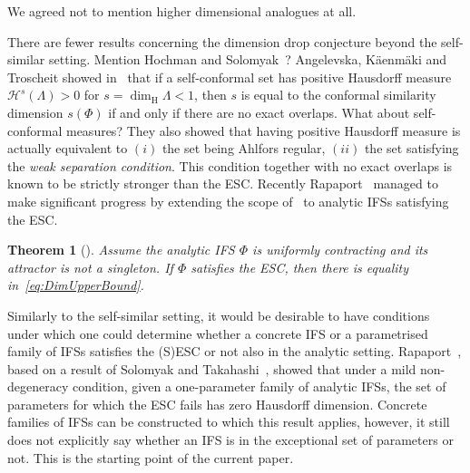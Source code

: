 \documentclass[12pt,]{article}
\newtheorem{theorem}{Theorem}[section]
\theoremstyle{definition}
\theoremstyle{remark}
\newcommand{\0}{\mathbf{0}}
\begin{document}
{{\color{red} We agreed not to mention higher dimensional analogues at all.
}


There are fewer results concerning the dimension drop conjecture beyond the self-similar setting. {\color{red} Mention Hochman and Solomyak~\cite{HochmanSolomyak_Invent17}?} Angelevska, K\"{a}enm\"{a}ki and Troscheit showed in~\cite{TroscheitKaenmakiAngelewska_SelfConf} that if a self-conformal set has positive Hausdorff measure $\mathcal{H}^s(\Lambda)>0$ for $s=\dim_{\mathrm{H}}\Lambda<1$, then $s$ is equal to the conformal similarity dimension $s(\Phi)$ if and only if there are no exact overlaps. {\color{red} What about self-conformal measures?} They also showed that having positive Hausdorff measure is actually equivalent to $(i)$ the set being Ahlfors regular, $(ii)$ the set satisfying the \emph{weak separation condition}. This condition together with no exact overlaps is known to be strictly stronger than the ESC. Recently Rapaport~\cite{Rapaport_SelfConfESC25arXiv} managed to make significant progress by extending the scope of~\cite{TroscheitKaenmakiAngelewska_SelfConf, Hochman_SelfSimESC_Annals} to analytic IFSs satisfying the ESC.

\begin{theorem}[\cite{Rapaport_SelfConfESC25arXiv}]\label{thm:RapaportMain}
Assume the analytic IFS $\Phi$ is uniformly contracting and its attractor is not a singleton. If $\Phi$ satisfies the ESC, then there is equality in~\cref{eq:DimUpperBound}.
\end{theorem}

Similarly to the self-similar setting, it would be desirable to have conditions under which one could determine whether a concrete IFS or a parametrised family of IFSs satisfies the (S)ESC or not also in the analytic setting. Rapaport~\cite[Corollary 1.4]{Rapaport_SelfConfESC25arXiv}, based on a result of Solomyak and Takahashi~\cite{SolomyakTakahashi_IMRN21}, showed that under a mild non-degeneracy condition, given a one-parameter family of analytic IFSs, the set of parameters for which the ESC fails has zero Hausdorff dimension. Concrete families of IFSs can be constructed to which this result applies, however, it still does not explicitly say whether an IFS is in the exceptional set of parameters or not. This is the starting point of the current paper.

}
\end{document}
